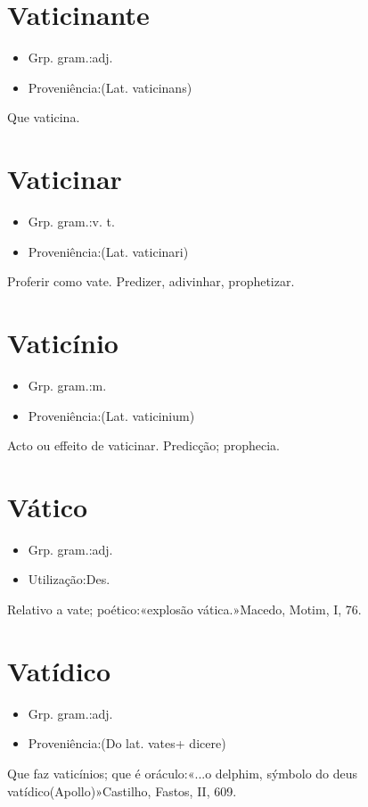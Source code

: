 \documentclass{article}
\begin{document}
\section{Vaticinante}
\begin{itemize}
\item {Grp. gram.:adj.}
\end{itemize}
\begin{itemize}
\item {Proveniência:(Lat. \textunderscore vaticinans\textunderscore )}
\end{itemize}
Que vaticina.
\section{Vaticinar}
\begin{itemize}
\item {Grp. gram.:v. t.}
\end{itemize}
\begin{itemize}
\item {Proveniência:(Lat. \textunderscore vaticinari\textunderscore )}
\end{itemize}
Proferir como vate.
Predizer, adivinhar, prophetizar.
\section{Vaticínio}
\begin{itemize}
\item {Grp. gram.:m.}
\end{itemize}
\begin{itemize}
\item {Proveniência:(Lat. \textunderscore vaticinium\textunderscore )}
\end{itemize}
Acto ou effeito de vaticinar.
Predicção; prophecia.
\section{Vático}
\begin{itemize}
\item {Grp. gram.:adj.}
\end{itemize}
\begin{itemize}
\item {Utilização:Des.}
\end{itemize}
Relativo a vate; poético:«\textunderscore explosão vática.\textunderscore »Macedo, \textunderscore Motim\textunderscore , I, 76.
\section{Vatídico}
\begin{itemize}
\item {Grp. gram.:adj.}
\end{itemize}
\begin{itemize}
\item {Proveniência:(Do lat. \textunderscore vates\textunderscore  + \textunderscore dicere\textunderscore )}
\end{itemize}
Que faz vaticínios; que é oráculo:«\textunderscore ...o delphim, sýmbolo do deus vatídico\textunderscore  (Apollo)»Castilho, \textunderscore Fastos\textunderscore , II, 609.
\end{document}
